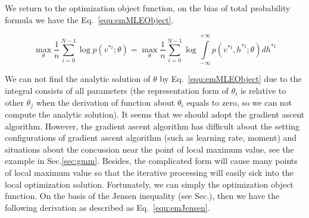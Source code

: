\documentclass[runningheads,openany]{xhlPaper}
\begin{document}
We return to the optimization object function, on the bias of total probability formula we have the Eq.~\ref{equ:emMLEObject}.

\begin{equation}
\label{equ:emMLEObject}
\mathop {\max }\limits_\theta  \frac{1}{n}\sum\limits_{i = 0}^{N - 1} {\log p\left( {{v^{*i}};\theta } \right)}  = \mathop {\max }\limits_\theta  \frac{1}{n}\sum\limits_{i = 0}^{N - 1} {\log \int\limits_{ - \infty }^{ + \infty } {p\left( {{v^{*i}},{h^{*i}};\theta } \right)d{h^{*i}}} } 
\end{equation}

We can not find the analytic solution of $\theta$ by Eq.~\ref{equ:emMLEObject} due to the integral consists of all parameters (the representation form of $\theta_{i}$ is relative to other $\theta_{j}$ when the derivation of function about $\theta_{i}$ equals to zero, so we can not compute the analytic solution). 
It seems that we  should adopt the gradient ascent algorithm. However, the gradient ascent algorithm has difficult about the setting configurations of gradient ascent algorithm (such as learning rate, moment) and situations about the concussion near the point of local maximum value, see the example in Sec.\ref{sec:gmm}. Besides, the complicated form will cause many points of local maximum value so that the iterative processing will easily sick into the local optimization solution.
Fortunately, we can simply the optimization object function. On the basis of the Jensen inequality (see Sec.), then we have the following derivation as described as Eq.~\ref{equ:emJensen}.
\end{document}
